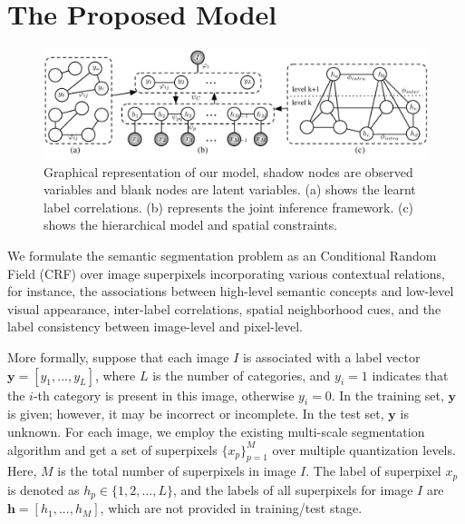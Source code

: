 
\section{The Proposed Model}

\begin{figure}[htb]
    \begin{center}
        \includegraphics[width=0.9\linewidth]{graphmodel.pdf}
    \end{center}
    \vspace{-3mm}
    \caption{Graphical representation of our model, shadow nodes are observed variables and blank nodes are latent variables. (a) shows the learnt label correlations. (b) represents the joint inference framework. (c) shows the hierarchical model and spatial constraints.}
    \label{fig:graphmodel}
\end{figure}

We formulate the semantic segmentation problem as an Conditional Random Field (CRF) over image superpixels incorporating various contextual relations, for instance, the associations between high-level semantic concepts and low-level visual appearance, inter-label correlations, spatial neighborhood cues, and the label consistency between image-level and pixel-level.


More formally, suppose that each image $I$ is associated with a label vector $\boldsymbol{y} = [y_1,...,y_L]$, where $L$ is the number of categories, and $y_i=1$ indicates that the $i$-th category is present in this image, otherwise $y_i=0$. In the training set, $\boldsymbol{y}$ is given; however, it may be incorrect or incomplete. In the test set, $\boldsymbol{y}$ is unknown.
For each image, we employ the existing multi-scale segmentation algorithm and get a set of superpixels   $\{x_p\}_{p=1}^M$ over multiple quantization levels.
Here, $M$ is the total number of superpixels in image $I$.
The label of superpixel $x_p$ is denoted as $h_p\in \{1,2,...,L\}$, and the labels of all superpixels for image $I$ are $\boldsymbol{h}=[h_1,...,h_M]$, which are not provided in training/test stage.

